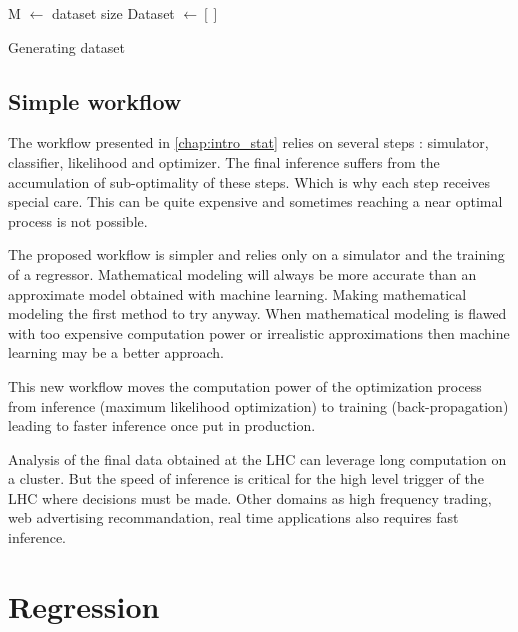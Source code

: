 \begin{algorithm}[H]
 M $\gets$ dataset size \;
 Dataset $\gets []$ \;
 \caption{Generating dataset}
\end{algorithm}








\subsection{Simple workflow} %
\label{sub:simple_workflow}

The workflow presented in \autoref{chap:intro_stat} relies on several steps : simulator, classifier, likelihood and optimizer.
The final inference suffers from the accumulation of sub-optimality of these steps.
Which is why each step receives special care.
This can be quite expensive and sometimes reaching a near optimal process is not possible.

The proposed workflow is simpler and relies only on a simulator and the training of a regressor.
Mathematical modeling will always be more accurate than an approximate model obtained with machine learning.
Making mathematical modeling the first method to try anyway.
When mathematical modeling is flawed with too expensive computation power or irrealistic approximations then machine learning may be a better approach.

This new workflow moves the computation power of the optimization process from inference (maximum likelihood optimization) to training (back-propagation) leading to faster inference once put in production.

Analysis of the final data obtained at the LHC can leverage long computation on a cluster.
But the speed of inference is critical for the high level trigger of the LHC where decisions must be made.
Other domains as high frequency trading, web advertising recommandation, real time applications also requires fast inference.




\section{Regression} %
\label{sec:regression}




